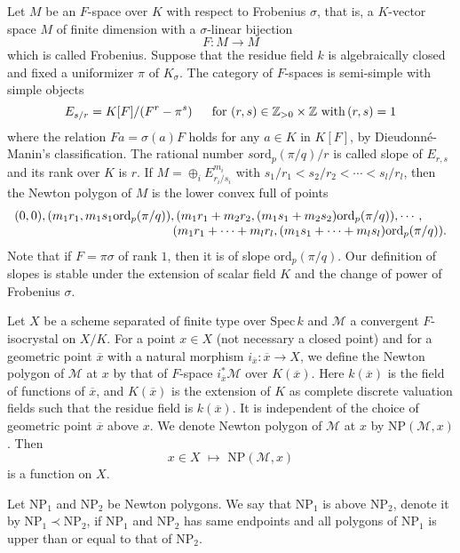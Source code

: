 \documentclass[11pt]{amsart}
\begin{document}
Let $M$ be an $F$-space over $K$ with respect to Frobenius $\sigma$, that is, 
a $K$-vector space $M$ of finite dimension with a $\sigma$-linear bijection 
$$
        F : M \rightarrow M 
$$
which is called Frobenius. 
Suppose that the residue field $k$ is algebraically closed and fixed a uniformizer 
$\pi$ of $K_\sigma$. The category of $F$-spaces is semi-simple with simple objects 
$$
       E_{s/r} = K[F]/(F^r - \pi^s)\, \hspace*{5mm} \mbox{for}\, \, 
       (r, s) \in \mathbb Z_{> 0} \times \mathbb Z\,\,\mbox{with}\, (r, s) = 1
$$
where the relation $Fa = \sigma(a)F$ holds for any $a \in K$ in $K[F]$, by Dieudonn\'e-Manin's classification. 
The rational number $s\mathrm{ord}_p(\pi/q)/r$ is called slope of $E_{r, s}$ and its rank over $K$ is $r$. 
If $M = \oplus_iE_{r_i/s_i}^{m_i}$ with $s_1/r_1<s_2/r_2<\cdots<s_l/r_l$, then the Newton polygon of $M$ 
is the lower convex full of points 
$$
   \begin{array}{l}
     (0, 0), (m_1r_1, m_1s_1\mathrm{ord}_p(\pi/q)), 
     (m_1r_1+m_2r_2, (m_1s_1+m_2s_2)\mathrm{ord}_p(\pi/q)), \cdots, \\
    \hspace*{45mm}  (m_1r_1+\cdots +m_lr_l, (m_1s_1+\cdots+m_ls_l)\mathrm{ord}_p(\pi/q)).
     \end{array}
$$
Note that if $F = \pi\sigma$ of rank $1$, then it is of slope $\mathrm{ord}_p(\pi/q)$. Our definition of slopes 
is stable under the extension of scalar field $K$ and the change of power of Frobenius $\sigma$. 

Let $X$ be a scheme separated of finite type over $\mathrm{Spec}\, k$ and $\mathcal M$ a convergent $F$-isocrystal 
on $X/K$. For a point $x \in X$ (not necessary a closed point) and for a geometric point $\overline{x}$ with a natural morphism 
$i_{\overline{x}} : \overline{x} \rightarrow X$, we define the Newton polygon of $\mathcal M$ at $x$ by 
that of $F$-space $i_{\overline{x}}^\ast\mathcal M$ 
over $K(\overline{x})$. Here $k(\overline{x})$ is the field of functions of $\overline{x}$, 
and $K(\overline{x})$ is the extension of $K$ as complete discrete valuation fields 
such that the residue field is $k(\overline{x})$. It is independent of the choice of geometric point $\overline{x}$ above $x$. 
We denote Newton polygon of $\mathcal M$ at $x$ by $\mathrm{NP}(\mathcal M, x)$. Then 
$$
       x \in X\,\, \mapsto\,\, \mathrm{NP}(\mathcal M, x)
$$ 
is a function on $X$. 

Let $\mathrm{NP}_1$ and $\mathrm{NP}_2$ be Newton polygons. We say that $\mathrm{NP}_1$ is above $\mathrm{NP}_2$, 
denote it by $\mathrm{NP}_1 \prec \mathrm{NP}_2$, 
if $\mathrm{NP}_1$ and $\mathrm{NP}_2$ has same endpoints and all polygons of $\mathrm{NP}_1$ is 
upper than or equal to that of $\mathrm{NP}_2$. 
\end{document}
